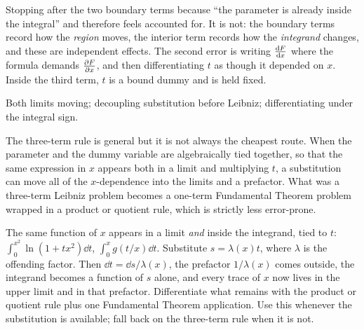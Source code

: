 \begin{trap}
Stopping after the two boundary terms because ``the parameter is already inside the integral'' and therefore feels accounted for. It is not: the boundary terms record how the \emph{region} moves, the interior term records how the \emph{integrand} changes, and these are independent effects. The second error is writing $\frac{\mathrm{d}F}{\mathrm{d}x}$ where the formula demands $\frac{\partial F}{\partial x}$, and then differentiating $t$ as though it depended on $x$. Inside the third term, $t$ is a bound dummy and is held fixed.
\end{trap}

\begin{seealsob}Both limits moving; decoupling substitution before Leibniz; differentiating under the integral sign.\end{seealsob}

The three-term rule is general but it is not always the cheapest route. When the parameter and the dummy variable are algebraically tied together, so that the same expression in $x$ appears both in a limit and multiplying $t$, a substitution can move all of the $x$-dependence into the limits and a prefactor. What was a three-term Leibniz problem becomes a one-term Fundamental Theorem problem wrapped in a product or quotient rule, which is strictly less error-prone.

\cue The same function of $x$ appears in a limit \emph{and} inside the integrand, tied to $t$: $\int_{0}^{x^{2}}\ln(1+tx^{2})\dd t$, $\int_{0}^{x}g(t/x)\dd t$.
\method Substitute $s=\lambda(x)t$, where $\lambda$ is the offending factor. Then $\dd t=\dd s/\lambda(x)$, the prefactor $1/\lambda(x)$ comes outside, the integrand becomes a function of $s$ alone, and every trace of $x$ now lives in the upper limit and in that prefactor. Differentiate what remains with the product or quotient rule plus one Fundamental Theorem application. Use this whenever the substitution is available; fall back on the three-term rule when it is not.

